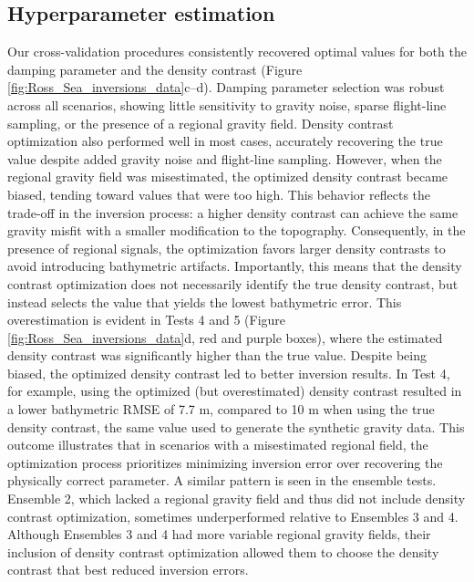 \documentclass[tc, manuscript]{copernicus}
\begin{document}
\subsection{Hyperparameter estimation}
Our cross-validation procedures consistently recovered optimal values for both the damping parameter and the density contrast (Figure \ref{fig:Ross_Sea_inversions_data}c–d). Damping parameter selection was robust across all scenarios, showing little sensitivity to gravity noise, sparse flight-line sampling, or the presence of a regional gravity field. Density contrast optimization also performed well in most cases, accurately recovering the true value despite added gravity noise and flight-line sampling. However, when the regional gravity field was misestimated, the optimized density contrast became biased, tending toward values that were too high. This behavior reflects the trade-off in the inversion process: a higher density contrast can achieve the same gravity misfit with a smaller modification to the topography. Consequently, in the presence of regional signals, the optimization favors larger density contrasts to avoid introducing bathymetric artifacts.
Importantly, this means that the density contrast optimization does not necessarily identify the true density contrast, but instead selects the value that yields the lowest bathymetric error. This overestimation is evident in Tests 4 and 5 (Figure \ref{fig:Ross_Sea_inversions_data}d, red and purple boxes), where the estimated density contrast was significantly higher than the true value.
Despite being biased, the optimized density contrast led to better inversion results. In Test 4, for example, using the optimized (but overestimated) density contrast resulted in a lower bathymetric RMSE of 7.7 m, compared to 10 m when using the true density contrast, the same value used to generate the synthetic gravity data. This outcome illustrates that in scenarios with a misestimated regional field, the optimization process prioritizes minimizing inversion error over recovering the physically correct parameter.
A similar pattern is seen in the ensemble tests. Ensemble 2, which lacked a regional gravity field and thus did not include density contrast optimization, sometimes underperformed relative to Ensembles 3 and 4. Although Ensembles 3 and 4 had more variable regional gravity fields, their inclusion of density contrast optimization allowed them to choose the density contrast that best reduced inversion errors.

\end{document}
